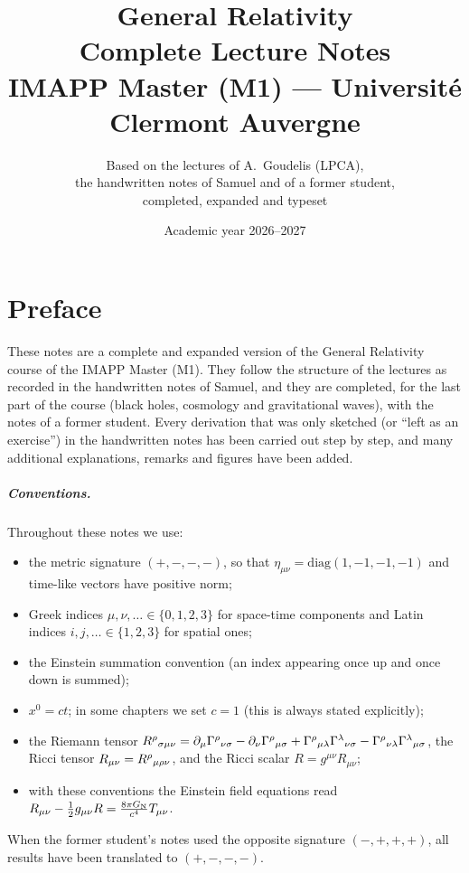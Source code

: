 \documentclass[11pt,a4paper]{report}
\title{\Huge\bfseries General Relativity\\[0.4em]
\Large Complete Lecture Notes\\[1.2em]
\large IMAPP Master (M1) --- Université Clermont Auvergne}
\author{Based on the lectures of A.~Goudelis (LPCA),\\
the handwritten notes of Samuel and of a former student,\\
completed, expanded and typeset}
\date{Academic year 2026--2027}
\begin{document}
\maketitle
\thispagestyle{empty}

\chapter*{Preface}
These notes are a complete and expanded version of the General Relativity course of the IMAPP Master (M1).
They follow the structure of the lectures as recorded in the handwritten notes of Samuel, and they are completed,
for the last part of the course (black holes, cosmology and gravitational waves), with the notes of a former student.
Every derivation that was only sketched (or ``left as an exercise'') in the handwritten notes has been carried out
step by step, and many additional explanations, remarks and figures have been added.

\paragraph{Conventions.} Throughout these notes we use:
\begin{itemize}[nosep]
  \item the metric signature $(+,-,-,-)$, so that $\eta_{\mu\nu}=\mathrm{diag}(1,-1,-1,-1)$ and time-like vectors have positive norm;
  \item Greek indices $\mu,\nu,\dots\in\{0,1,2,3\}$ for space-time components and Latin indices $i,j,\dots\in\{1,2,3\}$ for spatial ones;
  \item the Einstein summation convention (an index appearing once up and once down is summed);
  \item $x^0=ct$; in some chapters we set $c=1$ (this is always stated explicitly);
  \item the Riemann tensor $R^{\rho}{}_{\sigma\mu\nu}=\partial_\mu\Gamma^{\rho}{}_{\nu\sigma}-\partial_\nu\Gamma^{\rho}{}_{\mu\sigma}
        +\Gamma^{\rho}{}_{\mu\lambda}\Gamma^{\lambda}{}_{\nu\sigma}-\Gamma^{\rho}{}_{\nu\lambda}\Gamma^{\lambda}{}_{\mu\sigma}$,
        the Ricci tensor $R_{\mu\nu}=R^{\rho}{}_{\mu\rho\nu}$, and the Ricci scalar $R=g^{\mu\nu}R_{\mu\nu}$;
  \item with these conventions the Einstein field equations read $R_{\mu\nu}-\tfrac12 g_{\mu\nu}R=\frac{8\pi G_{\mathrm N}}{c^4}T_{\mu\nu}$.
\end{itemize}
When the former student's notes used the opposite signature $(-,+,+,+)$, all results have been translated to $(+,-,-,-)$.
\end{document}
